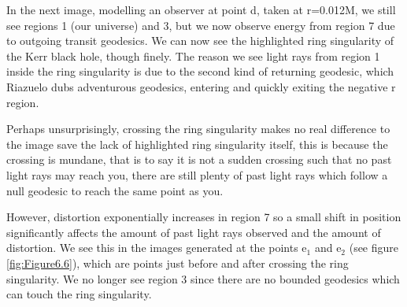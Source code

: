 \documentclass[oneside,openright,frontopenright, singlespacing]{dmathesis}
\begin{document}
	In the next image, modelling an observer at point d, taken at r=0.012M, we still see regions 1 (our universe) and 3, but we now observe energy from region 7 due to outgoing transit geodesics. We can now see the highlighted ring singularity of the Kerr black hole, though finely. The reason we see light rays from region 1 inside the ring singularity is due to the second kind of returning geodesic, which Riazuelo dubs adventurous geodesics, entering and quickly exiting the negative r region.

\vspace{1em}
	Perhaps unsurprisingly, crossing the ring singularity makes no real difference to the image save the lack of highlighted ring singularity itself, this is because the crossing is mundane, that is to say it is not a sudden crossing such that no past light rays may reach you, there are still plenty of past light rays which follow a null geodesic to reach the same point as you.

\vspace{1em}
	However, distortion exponentially increases in region 7 so a small shift in position significantly affects the amount of past light rays observed and the amount of distortion. We see this in the images generated at the points e$_1$ and e$_2$ (see figure \ref{fig:Figure6.6}), which are points just before and after crossing the ring singularity. We no longer see region 3 since there are no bounded geodesics which can touch the ring singularity.
\end{document}
